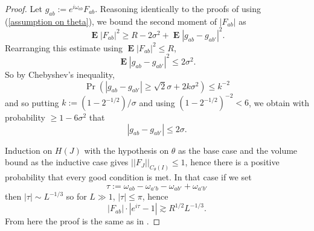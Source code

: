 \documentclass[reqno,10pt]{amsart}
\DeclareMathOperator*{\Expect}{\mathbf E}
\theoremstyle{definition}
\numberwithin{equation}{section}
\begin{document}
\begin{proof}
Let $g_{ab} := e^{i\omega_{ab}} F_{ab}$.
Reasoning identically to the proofs of \cite[Lemma 3.5, (3.25)]{Dyatlov_2018} using (\ref{assumption on theta}), we bound the second moment of $|F_{ab}|$ as 
$$\Expect |F_{ab}|^2 \geq R - 2\sigma^2 + \Expect |g_{ab} - g_{ab'}|^2.$$
Rearranging this estimate using $\Expect |F_{ab}|^2 \leq R$,
$$\Expect \left|g_{ab} - g_{ab'}\right|^2 \leq 2\sigma^2.$$
So by Chebyshev's inequality,
$$\Pr\left(|g_{ab} - g_{ab'}| \geq \sqrt 2 \sigma + 2k\sigma^2\right) \leq k^{-2}$$
and so putting $k := (1 - 2^{-1/2})/\sigma$ and using $(1 - 2^{-1/2})^{-2} < 6$, we obtain with probability $\geq 1 - 6\sigma^2$ that
\begin{equation}\label{bound on the phase diff}
|g_{ab} - g_{ab'}| \leq 2\sigma.
\end{equation}

Induction on $H(J)$ with the hypothesis on $\theta$ as the base case and the volume bound as the inductive case gives $||F_J||_{C_\theta(I)} \leq 1$, hence there is a positive probability that every good condition is met.
In that case if we set
$$\tau := \omega_{ab} - \omega_{a'b} - \omega_{ab'} + \omega_{a'b'}$$
then $|\tau| \sim L^{-1/3}$ so for $L \gg 1$, $|\tau| \leq \pi$, hence 
$$|F_{ab}| \cdot |e^{i\tau} - 1| \gtrsim R^{1/2} L^{-1/3}.$$
From here the proof is the same as in \cite[pg19]{Dyatlov_2018}.
\end{proof}



\printbibliography
\end{document}

